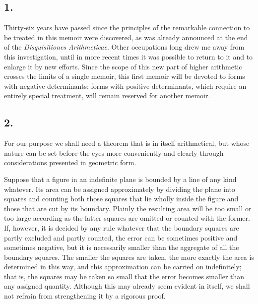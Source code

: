 \documentclass[12pt]{article}
\begin{document}
\subsection*{1.}

Thirty-six years have passed since the principles of the remarkable connection to be treated in this memoir were discovered, as was already announced at the end of the \emph{Disquisitiones Arithmeticae}. Other occupations long drew me away from this investigation, until in more recent times it was possible to return to it and to enlarge it by new efforts. Since the scope of this new part of higher arithmetic crosses the limits of a single memoir, this first memoir will be devoted to forms with negative determinants; forms with positive determinants, which require an entirely special treatment, will remain reserved for another memoir.

\subsection*{2.}

For our purpose we shall need a theorem that is in itself arithmetical, but whose nature can be set before the eyes more conveniently and clearly through considerations presented in geometric form.

Suppose that a figure in an indefinite plane is bounded by a line of any kind whatever. Its area can be assigned approximately by dividing the plane into squares and counting both those squares that lie wholly inside the figure and those that are cut by its boundary. Plainly the resulting area will be too small or too large according as the latter squares are omitted or counted with the former. If, however, it is decided by any rule whatever that the boundary squares are partly excluded and partly counted, the error can be sometimes positive and sometimes negative, but it is necessarily smaller than the aggregate of all the boundary squares. The smaller the squares are taken, the more exactly the area is determined in this way, and this approximation can be carried on indefinitely; that is, the squares may be taken so small that the error becomes smaller than any assigned quantity. Although this may already seem evident in itself, we shall not refrain from strengthening it by a rigorous proof.
\end{document}
